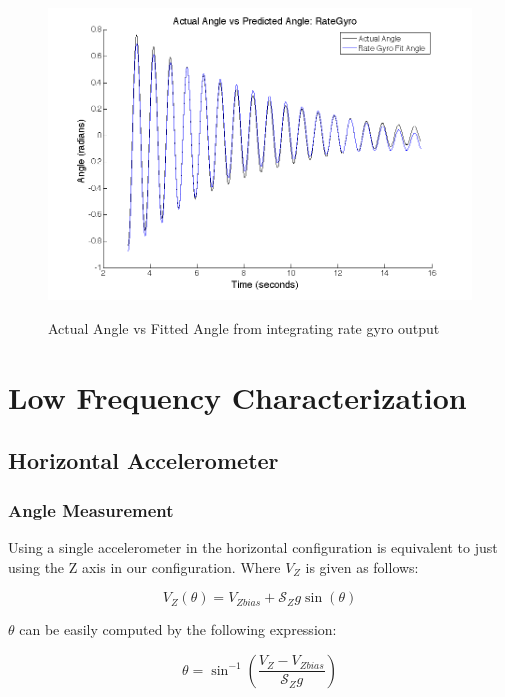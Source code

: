 \documentclass{article}
\theoremstyle{plain}
\theoremstyle{definition}
\theoremstyle{remark}
\newcommand{\Sens}{\mathcal{S}}
\begin{document}
\begin{figure}
\begin{center}
\includegraphics[width = 13cm]{rateGyroCalibResultsS8_636380.png}
\label{gyroCalib}
\caption{Actual Angle vs Fitted Angle from integrating rate gyro output}
\end{center}
\end{figure}

\clearpage
\section{Low Frequency Characterization}

\subsection{Horizontal Accelerometer}

\subsubsection{Angle Measurement}

Using a single accelerometer in the horizontal configuration is equivalent to just using the Z axis in our configuration.  Where $V_{Z}$ is given as follows: 

$$ V_{Z}(\theta) = V_{Zbias} + \Sens_{Z} g \sin(\theta) $$

$\theta$ can be easily computed by the following expression:

\begin{equation}
\theta = \sin^{-1}\left( \frac{V_{Z} - V_{Zbias}}{\Sens_{Z} g}\right) 
\label{horizontalEQ}
\end{equation}
\end{document}
